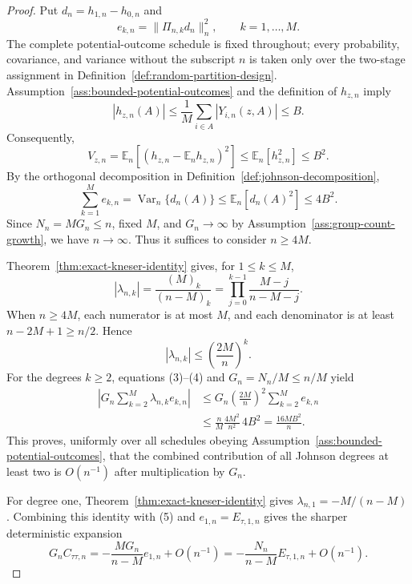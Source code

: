 \documentclass{article}
\begin{document}
\begin{proof}
Put \(d_n=h_{1,n}-h_{0,n}\) and
\[
e_{k,n}=\|\Pi_{n,k}d_n\|_n^2,
\qquad k=1,\ldots,M.
\]
The complete potential-outcome schedule is fixed throughout; every probability, covariance, and variance without the subscript \(n\) is taken only over the two-stage assignment in Definition~\ref{def:random-partition-design}.
Assumption~\ref{ass:bounded-potential-outcomes} and the definition of \(h_{z,n}\) imply
\[
|h_{z,n}(A)|
\leq \frac{1}{M}\sum_{i\in A}|Y_{i,n}(z,A)|
\leq B.                                                     \tag{1}
\]
Consequently,
\[
V_{z,n}
=\mathbb E_n\!\left[(h_{z,n}-\mathbb E_nh_{z,n})^2\right]
\leq \mathbb E_n[h_{z,n}^2]
\leq B^2.                                                   \tag{2}
\]
By the orthogonal decomposition in Definition~\ref{def:johnson-decomposition},
\[
\sum_{k=1}^M e_{k,n}
=\operatorname{Var}_n\{d_n(A)\}
\leq \mathbb E_n[d_n(A)^2]
\leq 4B^2.                                                  \tag{3}
\]
Since \(N_n=MG_n\leq n\), fixed \(M\), and \(G_n\to\infty\) by Assumption~\ref{ass:group-count-growth}, we have \(n\to\infty\).  Thus it suffices to consider \(n\geq4M\).

Theorem~\ref{thm:exact-kneser-identity} gives, for \(1\leq k\leq M\),
\[
|\lambda_{n,k}|
=\frac{(M)_k}{(n-M)_k}
=\prod_{j=0}^{k-1}\frac{M-j}{n-M-j}.
\]
When \(n\geq4M\), each numerator is at most \(M\), and each denominator is at least \(n-2M+1\geq n/2\).  Hence
\[
|\lambda_{n,k}|\leq\left(\frac{2M}{n}\right)^k.            \tag{4}
\]
For the degrees \(k\geq2\), equations (3)--(4) and \(G_n=N_n/M\leq n/M\) yield
\[
\begin{aligned}
\left|G_n\sum_{k=2}^M\lambda_{n,k}e_{k,n}\right|
&\leq G_n\left(\frac{2M}{n}\right)^2
       \sum_{k=2}^M e_{k,n}\\
&\leq \frac{n}{M}\frac{4M^2}{n^2}\,4B^2
=\frac{16MB^2}{n}.                                         \tag{5}
\end{aligned}
\]
This proves, uniformly over all schedules obeying Assumption~\ref{ass:bounded-potential-outcomes}, that the combined contribution of all Johnson degrees at least two is \(O(n^{-1})\) after multiplication by \(G_n\).

For degree one, Theorem~\ref{thm:exact-kneser-identity} gives \(\lambda_{n,1}=-M/(n-M)\).  Combining this identity with (5) and \(e_{1,n}=E_{\tau,1,n}\) gives the sharper deterministic expansion
\[
G_nC_{\tau\tau,n}
=-\frac{MG_n}{n-M}e_{1,n}+O(n^{-1})
=-\frac{N_n}{n-M}E_{\tau,1,n}+O(n^{-1}).                   \tag{6}
\]


\end{proof}
\end{document}
